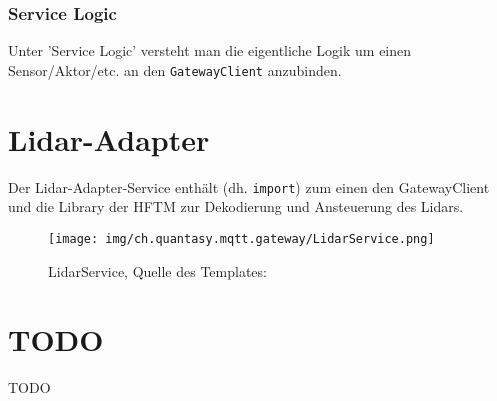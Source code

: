 \subsubsection{Service Logic}
Unter 'Service Logic' versteht man die eigentliche Logik um einen Sensor/Aktor/etc. an den \verb|GatewayClient| anzubinden.


\section{Lidar-Adapter}
Der Lidar-Adapter-Service enthält (dh. \verb|import|) zum einen den GatewayClient  und die Library der HFTM zur Dekodierung und Ansteuerung des Lidars.
\begin{figure}[H]
	\centering
	\texttt{[image: img/ch.quantasy.mqtt.gateway/LidarService.png]}
	\caption{LidarService, Quelle des Templates: \cite{ch.quantasy.mqtt.gateway}}
	\label{fig:lidarservice}
\end{figure}

\section{TODO}

TODO

